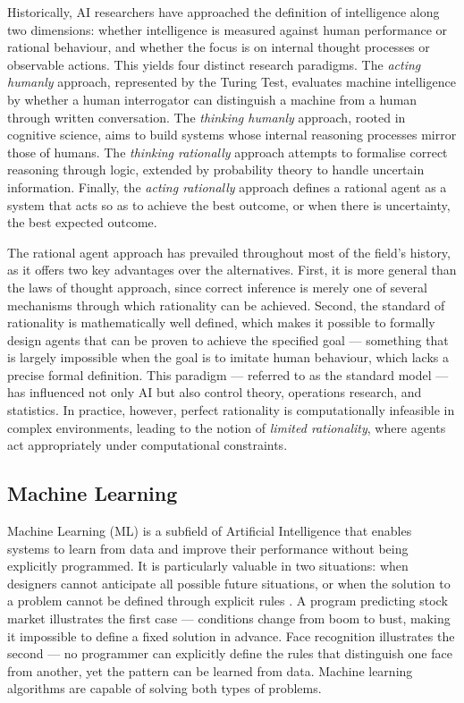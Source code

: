 Historically, AI researchers have approached the definition of intelligence
along two dimensions: whether intelligence is measured against human
performance or rational behaviour, and whether the focus is on internal
thought processes or observable actions. This yields four
distinct research paradigms. The \textit{acting humanly} approach, represented
by the Turing Test, evaluates machine intelligence by whether a human
interrogator can distinguish a machine from a human through written
conversation. The \textit{thinking humanly} approach, rooted in cognitive
science, aims to build systems whose internal reasoning processes mirror those
of humans. The \textit{thinking rationally} approach attempts to formalise
correct reasoning through logic, extended by probability theory to handle
uncertain information. Finally, the \textit{acting rationally} approach defines
a rational agent as a system that acts so as to achieve the best outcome, or
when there is uncertainty, the best expected outcome.

The rational agent approach has prevailed throughout most of the field's
history, as it offers two key advantages over the alternatives. First, it is
more general than the laws of thought approach, since correct inference is
merely one of several mechanisms through which rationality can be achieved.
Second, the standard of rationality is mathematically well
  defined, which makes it possible to formally design agents
  that can be proven to achieve the specified goal --- something
  that is largely impossible when the goal is to imitate human
  behaviour, which lacks a precise formal definition. This paradigm
--- referred to as the standard model --- has influenced not only AI but also
control theory, operations research, and statistics. In practice, however,
perfect rationality is computationally infeasible in complex environments,
leading to the notion of \textit{limited rationality}, where agents act
appropriately under computational constraints.

\subsection{Machine Learning}
\label{subsec:ml}

Machine Learning (ML) is a subfield of Artificial Intelligence that enables
systems to learn from data and improve their performance without being
explicitly programmed.  It is
  particularly valuable in two situations: when designers cannot
  anticipate all possible future situations, or when the solution
  to a problem cannot be defined through explicit rules \cite{russell2022}. A program
  predicting stock market  \cite{chakravorty2025} illustrates the first
  case --- conditions change from boom to bust, making it
  impossible to define a fixed solution in advance. Face recognition \cite{sudiana2021}
  illustrates the second --- no programmer can explicitly define
  the rules that distinguish one face from another, yet the
  pattern can be learned from data. Machine learning algorithms
  are capable of solving both types of problems.

